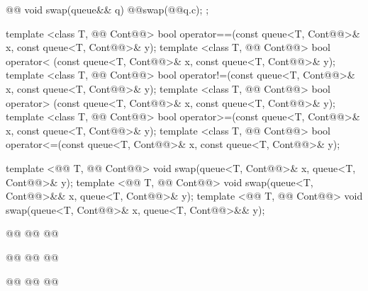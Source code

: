 \documentclass[american,twoside]{book}
\begin{document}
\begin{codeblock}
{{    @@
      void swap(queue&& q)              { @@swap(@@q.c); }
  };

  template <class T, @@ Cont@@>
    bool operator==(const queue<T, Cont@@>& x, const queue<T, Cont@@>& y);
  template <class T, @@ Cont@@>
    bool operator< (const queue<T, Cont@@>& x, const queue<T, Cont@@>& y);
  template <class T, @@ Cont@@>
    bool operator!=(const queue<T, Cont@@>& x, const queue<T, Cont@@>& y);
  template <class T, @@ Cont@@>
    bool operator> (const queue<T, Cont@@>& x, const queue<T, Cont@@>& y);
  template <class T, @@ Cont@@>
    bool operator>=(const queue<T, Cont@@>& x, const queue<T, Cont@@>& y);
  template <class T, @@ Cont@@>
    bool operator<=(const queue<T, Cont@@>& x, const queue<T, Cont@@>& y);

  template <@@ T, @@ Cont@@>
    void swap(queue<T, Cont@@>& x, queue<T, Cont@@>& y);
  template <@@ T, @@ Cont@@>
    void swap(queue<T, Cont@@>&& x, queue<T, Cont@@>& y);
  template <@@ T, @@ Cont@@>
    void swap(queue<T, Cont@@>& x, queue<T, Cont@@>&& y);

  @@
    @@
    @@

  @@
    @@
      @@

  @@
    @@
      @@
}
\end{codeblock}
\end{document}
